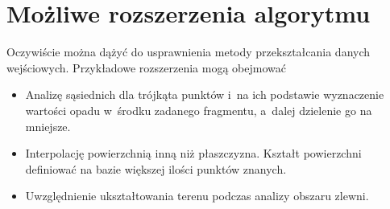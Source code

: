 \section{Możliwe rozszerzenia algorytmu}
Oczywiście można dążyć do usprawnienia metody przekształcania danych wejściowych.
Przykładowe rozszerzenia mogą obejmować
\begin{itemize}
\item{ Analizę sąsiednich dla trójkąta punktów i~na ich podstawie wyznaczenie wartości opadu w~środku zadanego fragmentu, a~dalej dzielenie go na mniejsze. }

\item{ Interpolację powierzchnią inną niż płaszczyzna. Kształt powierzchni definiować na bazie większej ilości punktów znanych. }

\item{ Uwzględnienie ukształtowania terenu podczas analizy obszaru zlewni. }
\end{itemize}